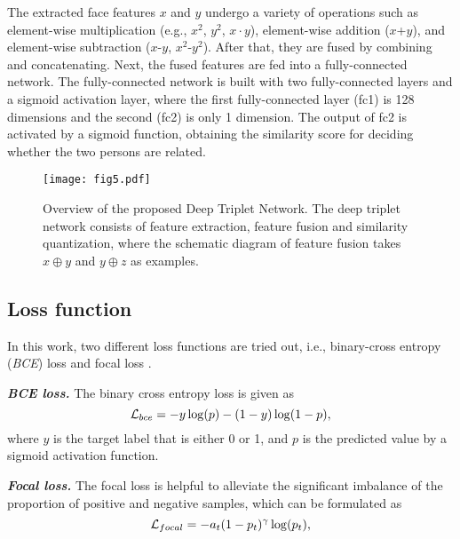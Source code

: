 \documentclass[a4paper, 10pt, conference]{ieeeconf}      %
\begin{document}
The extracted face features $x$ and $y$ undergo a variety of operations such as element-wise multiplication (e.g., $x^2$, $y^2$, $x\cdot y$), element-wise addition ($x$+$y$), and element-wise subtraction ($x$-$y$, $x^2$-$y^2$). After that, they are fused by combining and concatenating. Next, the fused features are fed into a fully-connected network. The fully-connected network is built with two fully-connected layers and a sigmoid activation layer, where the first fully-connected layer (fc1) is 128 dimensions and the second (fc2) is only 1 dimension. The output of fc2 is activated by a sigmoid function, obtaining the similarity score for deciding whether the two persons are related.


\begin{figure*}[t]
\setlength{\abovecaptionskip}{0.0cm}
\setlength{\belowcaptionskip}{-0.0cm}
\begin{minipage}[b]{1.0\linewidth}
  \centering
  \centerline{\texttt{[image: fig5.pdf]}}
\end{minipage}
\caption{Overview of the proposed Deep Triplet Network. The deep triplet network consists of feature extraction, feature fusion and similarity quantization, where the schematic diagram of feature fusion takes $x\oplus y$ and $y\oplus z$ as examples.}
\label{fig:fig5}
\end{figure*}

\subsection{Loss function}

In this work, two different loss functions are tried out, i.e., binary-cross entropy (\emph{BCE}) loss and focal loss \cite{c18}.

\textbf{\emph{BCE loss.}} The binary cross entropy loss is given as
\begin{equation}
\setlength{\abovedisplayskip}{0.2cm}
\setlength{\belowdisplayskip}{0.2cm}
{\mathcal{L}_{bce}} = -{y}\log({p}) - (1-{y})\log({1-p}),
\end{equation}
where $y$ is the target label that is either 0 or 1, and $p$ is the predicted value by a sigmoid activation function.

\textbf{\emph{Focal loss.}} The focal loss is helpful to alleviate the significant imbalance of the proportion of positive and negative samples, which can be formulated as
\begin{equation}
\setlength{\abovedisplayskip}{0.2cm}
\setlength{\belowdisplayskip}{0.2cm}
{\mathcal{L}_{focal}} = -{a_t}({1-p_t})^{\gamma}\log({p_t}),
\end{equation}
\end{document}
